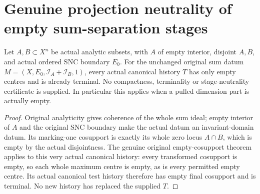 \section{Genuine projection neutrality of empty sum-separation stages}

\begin{lemma}
\label{hir:original-disjoint-sum-all-empty-canonical-stage}
\leanok
Let $A,B\subset X^n$ be actual analytic subsets, with $A$ of empty
interior, disjoint $A,B$, and actual ordered SNC boundary $E_0$.
For the unchanged original sum datum
$M=(X,E_0,\mathcal I_A+\mathcal I_B,1)$, every actual canonical history
$T$ has only empty centres and is already terminal. No compactness,
terminality or stage-neutrality certificate is supplied. In particular
this applies when a pulled dimension part is actually empty.
\end{lemma}
\begin{proof}
Original analyticity gives coherence of the whole sum ideal; empty
interior of $A$ and the original SNC boundary make the actual datum an
invariant-domain datum. Its marking-one cosupport is exactly its whole
zero locus $A\cap B$, which is empty by the actual disjointness.
The genuine original empty-cosupport theorem applies to this very actual
canonical history: every transformed cosupport is empty, so each whole
maximum centre is empty, as is every permitted empty centre. Its actual
canonical test history therefore has empty final cosupport and is
terminal. No new history has replaced the supplied $T$.
\end{proof}

